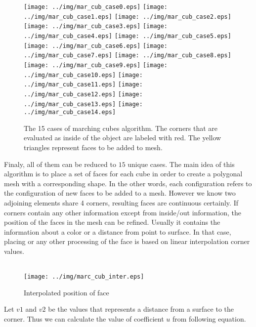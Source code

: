 \begin{figure}[ht]
\texttt{[image: ../img/mar\_cub\_case0.eps]}
\texttt{[image: ../img/mar\_cub\_case1.eps]}
\texttt{[image: ../img/mar\_cub\_case2.eps]}
\texttt{[image: ../img/mar\_cub\_case3.eps]}
\texttt{[image: ../img/mar\_cub\_case4.eps]}
\texttt{[image: ../img/mar\_cub\_case5.eps]}
\texttt{[image: ../img/mar\_cub\_case6.eps]}
\texttt{[image: ../img/mar\_cub\_case7.eps]}
\texttt{[image: ../img/mar\_cub\_case8.eps]}
\texttt{[image: ../img/mar\_cub\_case9.eps]}
\texttt{[image: ../img/mar\_cub\_case10.eps]}
\hspace{1mm}
\texttt{[image: ../img/mar\_cub\_case11.eps]}
\hspace{2mm}
\texttt{[image: ../img/mar\_cub\_case12.eps]}
\hspace{2mm}
\texttt{[image: ../img/mar\_cub\_case13.eps]}
\hspace{3mm}
\texttt{[image: ../img/mar\_cub\_case14.eps]}
\caption{The 15 cases of marching cubes algorithm. The corners that are evaluated as inside of the object
are labeled with red. The yellow triangles represent faces to be added to mesh.}
\label{fig:mc_cases}
\end{figure}

Finaly, all of them can be reduced to $15$ unique cases. The main idea of this algorithm is to
place a set of faces for each cube in order to create a polygonal mesh with a corresponding shape.
In the other words, each configuration refers to the configuration of new faces to be added to a mesh.
However we know two adjoining elements share 4 corners, resulting faces are continuous certainly.
If corners contain any other information except from inside/out information, the position of 
the faces in the mesh can be refined. Usually it contains the information about a color or
a distance from point to surface. In that case, placing or any other processing of
the face is based on linear interpolation corner values.\\
\\

\begin{figure}[!htbp]
\centering
\texttt{[image: ../img/marc\_cub\_inter.eps]}
\label{fig:mc_interpolation}
\caption{Interpolated position of face}
\end{figure}

Let $v1$ and $v2$ be the values that represents a distance from a surface to the corner.
Thus we can calculate the value of coefficient $u$ from following equation.

